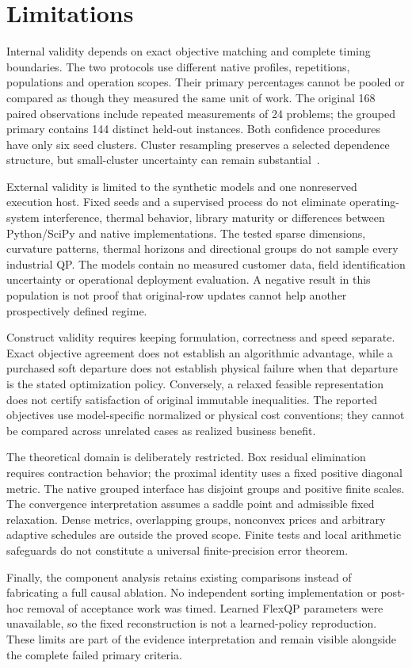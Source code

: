 \section{Limitations}\label{sec:limitations}
Internal validity depends on exact objective matching and complete
timing boundaries. The two protocols use different native
profiles, repetitions, populations and operation scopes. Their
primary percentages cannot be pooled or compared as though
they measured the same unit of work. The original 168 paired
observations include repeated measurements of 24 problems;
the grouped primary contains 144 distinct held-out instances.
Both confidence procedures have only six seed clusters.
Cluster resampling preserves a selected dependence structure,
but small-cluster uncertainty can remain substantial~\cite{cameron}.

External validity is limited to the synthetic models and one
nonreserved execution host. Fixed seeds and a supervised process
do not eliminate operating-system interference, thermal behavior,
library maturity or differences between Python/SciPy and native
implementations. The tested sparse dimensions, curvature patterns,
thermal horizons and directional groups do not sample every
industrial QP. The models contain no measured customer data,
field identification uncertainty or operational deployment
evaluation. A negative result in this population is not proof
that original-row updates cannot help another prospectively
defined regime.

Construct validity requires keeping formulation, correctness and
speed separate. Exact objective agreement does not establish
an algorithmic advantage, while a purchased soft departure does
not establish physical failure when that departure is the stated
optimization policy. Conversely, a relaxed feasible representation
does not certify satisfaction of original immutable inequalities.
The reported objectives use model-specific normalized or physical
cost conventions; they cannot be compared across unrelated
cases as realized business benefit.

The theoretical domain is deliberately restricted. Box residual
elimination requires contraction behavior; the proximal identity
uses a fixed positive diagonal metric. The native grouped
interface has disjoint groups and positive finite scales.
The convergence interpretation assumes a saddle point and
admissible fixed relaxation. Dense metrics, overlapping groups,
nonconvex prices and arbitrary adaptive schedules are outside
the proved scope. Finite tests and local arithmetic safeguards
do not constitute a universal finite-precision error theorem.

Finally, the component analysis retains existing comparisons
instead of fabricating a full causal ablation. No independent
sorting implementation or post-hoc removal of acceptance work
was timed. Learned FlexQP parameters were unavailable, so the
fixed reconstruction is not a learned-policy reproduction.
These limits are part of the evidence interpretation and
remain visible alongside the complete failed primary criteria.
